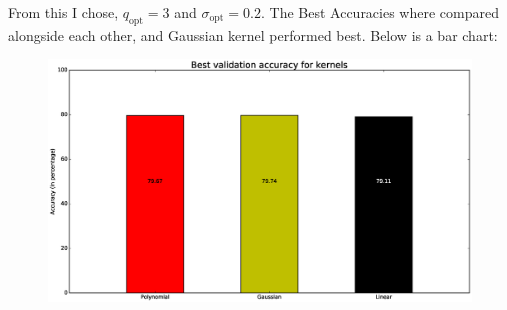 \documentclass{article}
\begin{document}
\begin{flushleft}
From this I chose, \(q_{\text{opt}} = 3\) and \(\sigma_{\text{opt}} = 0.2\). The Best Accuracies where compared alongside each other, and Gaussian kernel performed best. Below is a bar chart:
\begin{figure}[H]
\centering
\includegraphics[width=0.75\linewidth]{./images/comparison_3.eps}
\end{figure}
\end{flushleft}
\end{document}
